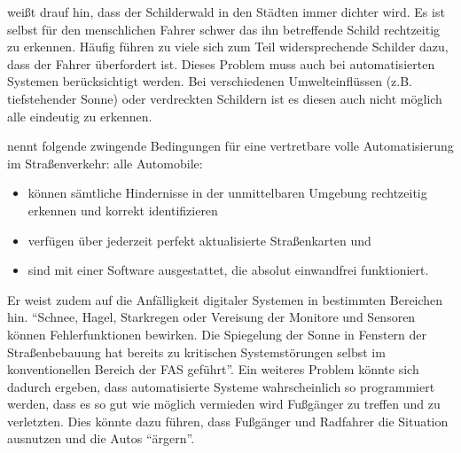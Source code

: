 \Textcite[S. 55]{Bremer.2004} weißt drauf hin, dass der Schilderwald in den Städten immer dichter wird. Es ist selbst für den menschlichen Fahrer schwer das ihn betreffende Schild rechtzeitig zu erkennen. Häufig führen zu viele sich zum Teil widersprechende Schilder dazu, dass der Fahrer überfordert ist. Dieses Problem muss auch bei automatisierten Systemen berücksichtigt werden. Bei verschiedenen Umwelteinflüssen (z.B. tiefstehender Sonne) oder verdreckten Schildern ist es diesen auch nicht möglich alle eindeutig zu erkennen. 

\Textcite[S. 639]{Kossak.2017} nennt folgende  zwingende Bedingungen für eine vertretbare volle Automatisierung im Straßenverkehr: alle Automobile:
\begin{itemize}
	\item können sämtliche Hindernisse in der unmittelbaren Umgebung rechtzeitig erkennen und korrekt identifizieren
	\item verfügen über jederzeit perfekt aktualisierte Straßenkarten und
	\item sind mit einer Software ausgestattet, die absolut einwandfrei funktioniert.
\end{itemize}

Er weist zudem auf die Anfälligkeit digitaler Systemen in bestimmten Bereichen hin. \enquote{Schnee, Hagel, Starkregen oder Vereisung der Monitore und Sensoren können Fehlerfunktionen bewirken. Die Spiegelung der Sonne in Fenstern der Straßenbebauung hat bereits zu kritischen Systemstörungen selbst im konventionellen Bereich der FAS geführt}. Ein weiteres Problem könnte sich dadurch ergeben, dass automatisierte Systeme wahrscheinlich so programmiert werden, dass es so gut wie möglich vermieden wird Fußgänger zu treffen und zu verletzten. Dies könnte dazu führen, dass Fußgänger und Radfahrer die Situation ausnutzen und die Autos \enquote{ärgern}. 
